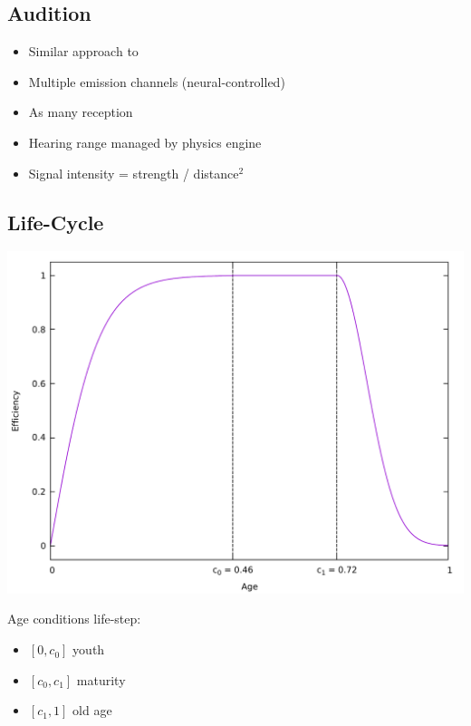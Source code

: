 \documentclass[
auto_sections,
monitor_progress,
draft
]{mannbeamer}
\begin{document}
\subsection{Audition}
\begin{frame}[hok]
 \begin{itemize}
  \item Similar approach to \cite{Kadish2019}
  \item Multiple emission channels (neural-controlled)
  \item As many reception
  \item Hearing range managed by physics engine
  \item Signal intensity = strength / distance$^2$
 \end{itemize}

\end{frame}

\subsection{Life-Cycle}
\begin{frame}[ok]
 \begin{minipage}{.59\textwidth}
  \includegraphics[height=.59\textheight]{efficiency_plot}
 \end{minipage}
 \begin{minipage}{.39\textwidth}
  Age conditions life-step:
  \begin{itemize}
   \item $[0,c_0]$ youth
   \item $[c_0,c_1]$ maturity
   \item $[c_1, 1]$ old age
  \end{itemize}
 \end{minipage}
\end{frame}
\end{document}
